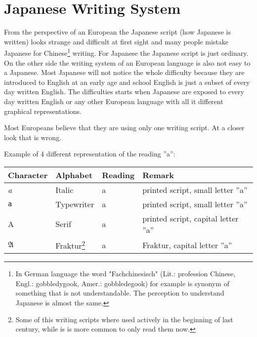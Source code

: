 \chapter{Japanese Writing System}
\label{chap:JapaneseWritingSystem}


From the perspective of an European the Japanese script (how Japanese is
written) looks strange and difficult at first sight and many people mistake
Japanese for Chinese\footnote{In German language the word "Fachchinesisch"
(Lit.: profession Chinese, Engl.: gobbledygook, Amer.: gobbledegook) for
example is synonym of something that is not understandable. The perception to
understand Japanese is almost the same.} writing. For Japanese the Japanese
script is just ordinary. On the other side the writing system of an European
language is also not easy to a Japanese. Most Japanese will not notice the
whole difficulty because they are introduced to English at an early age and
school English is just a subset of every day written English. The difficulties
starts when Japanese are exposed to every day written English or any other
European language with all it different graphical representations.

Most Europeans believe that they are using only one writing script. At a closer
look that is wrong.

\bigskip Example of 4 different representation of the reading ''a'':

\begin{center}
\begin{tabular}{|l|l|l|l|}
\textbf{Character}&\textbf{Alphabet}&\textbf{Reading}&\textbf{Remark}\\\hline
\textit{a}     &  Italic        & a & printed script, small letter ''a'' \\
\texttt{a}     &  Typewriter    & a & printed script, small letter ''a'' \\
A              &  Serif         & a & printed script, capital letter ''a'' \\
$\mathfrak{A}$ & Fraktur\footnote{Some of this writing scripts where used
actively in the beginning of last century, while is is more common to only
read them now.}& a & Fraktur, capital letter ''a''  \\
\end{tabular}
\end{center}

